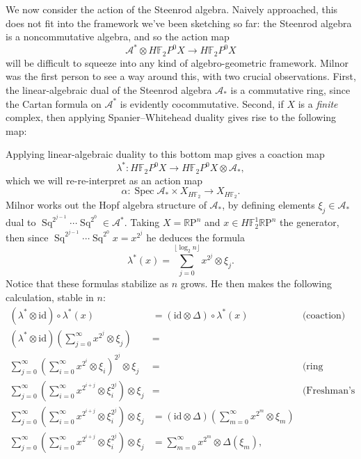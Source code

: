 \documentclass{article}
\newcommand{\F}{\mathbb F}
\newcommand{\R}{\mathbb R}
\newcommand{\RP}{\R\mathrm P}
\newcommand{\<}{\langle}
\renewcommand{\>}{\rangle}
\newcommand{\id}{\mathrm{id}}
\DeclareMathOperator{\Spec}{Spec}
\DeclareMathOperator{\Sq}{Sq}
\numberwithin{equation}{section}
\theoremstyle{plain}
\theoremstyle{definition}
\theoremstyle{remark}
\begin{document}
We now consider the action of the Steenrod algebra.  Naively approached, this does not fit into the framework we've been sketching so far: the Steenrod algebra is a noncommutative algebra, and so the action map \[\mathcal A^* \otimes H\F_2P^0 X \to H\F_2P^0 X\] will be difficult to squeeze into any kind of algebro-geometric framework.  Milnor was the first person to see a way around this, with two crucial observations.  First, the linear-algebraic dual of the Steenrod algebra $\mathcal A_*$ is a commutative ring, since the Cartan formula on $\mathcal A^*$ is evidently cocommutative.  Second, if $X$ is a \emph{finite} complex, then applying Spanier--Whitehead duality gives rise to the following map:
\begin{center}
\end{center}
Applying linear-algebraic duality to this bottom map gives a coaction map \[\lambda^*: H\F_2P^0 X \to H\F_2P^0 X \otimes \mathcal A_*,\] which we will re-re-interpret as an action map \[\alpha: \Spec \mathcal A_* \times X_{H\F_2} \to X_{H\F_2}.\]  Milnor works out the Hopf algebra structure of $\mathcal A_*$, by defining elements $\xi_j \in \mathcal A_*$ dual to $\Sq^{2^{j-1}} \cdots \Sq^{2^0} \in \mathcal A^*$.  Taking $X = \RP^n$ and $x \in H\F_2^1 \RP^n$ the generator, then since $\Sq^{2^{j-1}} \cdots \Sq^{2^0} x = x^{2^j}$ he deduces the formula \[\lambda^*(x) = \sum_{j=0}^{\lfloor \log_2 n \rfloor} x^{2^j} \otimes \xi_j.\]  Notice that these formulas stabilize as $n$ grows.  He then makes the following calculation, stable in $n$:
\begin{align*}
(\lambda^* \otimes \id) \circ \lambda^*(x) & = (\id \otimes \Delta) \circ \lambda^*(x) & \text{(coaction)} \\
(\lambda^* \otimes \id) \left( \sum_{j=0}^\infty x^{2^j} \otimes \xi_j \right) & = \\
\sum_{j=0}^\infty \left( \sum_{i=0}^\infty x^{2^i} \otimes \xi_i \right)^{2^j} \otimes \xi_j & = & \text{(ring homomorphism)} \\
\sum_{j=0}^\infty \left( \sum_{i=0}^\infty x^{2^{i+j}} \otimes \xi_i^{2^j} \right) \otimes \xi_j & = & \text{(Freshman's dream)} \\
\sum_{j=0}^\infty \left( \sum_{i=0}^\infty x^{2^{i+j}} \otimes \xi_i^{2^j} \right) \otimes \xi_j & = (\id \otimes \Delta) \left( \sum_{m=0}^\infty x^{2^m} \otimes \xi_m \right) \\
\sum_{j=0}^\infty \left( \sum_{i=0}^\infty x^{2^{i+j}} \otimes \xi_i^{2^j} \right) \otimes \xi_j & = \sum_{m=0}^\infty x^{2^m} \otimes \Delta(\xi_m),
\end{align*}
\end{document}
